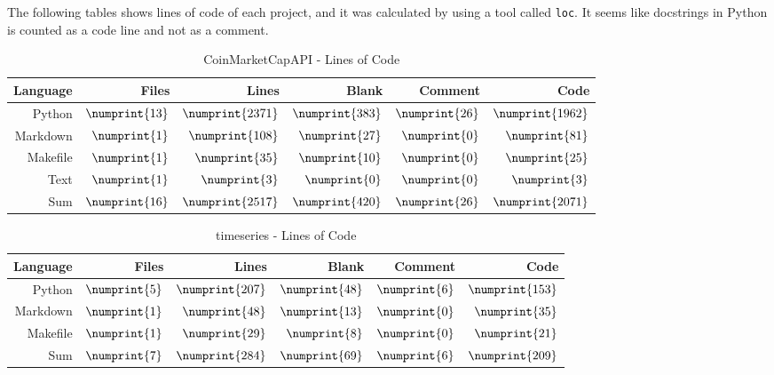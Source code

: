 The following tables shows lines of code of each project, and it was calculated by using a tool called \texttt{loc}. It seems like docstrings in Python is counted as a code line and not as a comment.

\begin{table}[ht]
        \centering
        \begin{tabularx}{\textwidth}{ |R|R|R|R|R|R| }\hline
        Language    & Files             & Lines             & Blank             & Comment           & Code              \\\hline
        Python      & $\numprint{13}$   & $\numprint{2371}$ & $\numprint{383}$  & $\numprint{26}$   & $\numprint{1962}$ \\
        Markdown    & $\numprint{1}$    & $\numprint{108}$  & $\numprint{27}$   & $\numprint{0}$    & $\numprint{81}$   \\
        Makefile    & $\numprint{1}$    & $\numprint{35}$   & $\numprint{10}$   & $\numprint{0}$    & $\numprint{25}$   \\
        Text        & $\numprint{1}$    & $\numprint{3}$    & $\numprint{0}$    & $\numprint{0}$    & $\numprint{3}$    \\\hline
        Sum         & $\numprint{16}$   & $\numprint{2517}$ & $\numprint{420}$  & $\numprint{26}$   & $\numprint{2071}$ \\\hline
        \end{tabularx}
        \caption{CoinMarketCapAPI - Lines of Code}
        \label{tab:cloc_coin}
\end{table}

\begin{table}[ht]
        \centering
        \begin{tabularx}{\textwidth}{ |R|R|R|R|R|R| }\hline
        Language    & Files             & Lines             & Blank             & Comment           & Code              \\\hline
        Python      & $\numprint{5}$    & $\numprint{207}$  & $\numprint{48}$   & $\numprint{6}$    & $\numprint{153}$  \\
        Markdown    & $\numprint{1}$    & $\numprint{48}$   & $\numprint{13}$   & $\numprint{0}$    & $\numprint{35}$   \\
        Makefile    & $\numprint{1}$    & $\numprint{29}$   & $\numprint{8}$    & $\numprint{0}$    & $\numprint{21}$   \\\hline
        Sum         & $\numprint{7}$    & $\numprint{284}$  & $\numprint{69}$   & $\numprint{6}$    & $\numprint{209}$  \\\hline
        \end{tabularx}
        \caption{timeseries - Lines of Code}
        \label{tab:cloc_timeseries}
\end{table}

